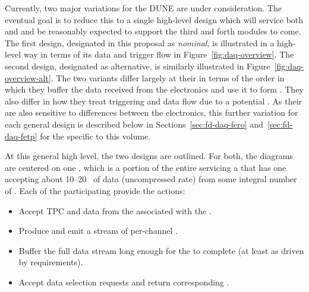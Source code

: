 Currently, two major variations for the DUNE  are under consideration. %
The eventual goal is to reduce this to a single high-level design
which will service both \single and \dual {} and be reasonably
expected to support the third and forth modules to come.
The first design, designated in this proposal as \textit{nominal}, is
illustrated in a high-level way in terms of its data and trigger flow
in Figure~\ref{fig:daq-overview}. 
The second design, designated as alternative, is similarly
illustrated in Figure~\ref{fig:daq-overview-alt}. 
The two variants differ largely at their  in terms of the
order in which they buffer the data received from the  
electronics and use it to form . 
They also differ in how they treat triggering and data flow due to a
potential . 
As their  are also sensitive to differences between the
 electronics, this further variation for each general
design is described below in Sections~\ref{sec:fd-daq-fero}
and~\ref{sec:fd-daq-fetp} for the   specific to this volume.

At this general high level, the two designs are outlined. %
For both, the diagrams are %
centered on one 
, which is a portion of the entire  servicing a
 that has one  accepting about
\numrange{10}{20}~\si{\Gbps} of data (uncompressed rate) from some integral
number of . 
Each of the participating  provide the actions:
\begin{itemize}
\item Accept TPC and  data from the  associated with the .
\item Produce and emit a stream of per-channel .
\item Buffer the full data stream long enough for the  to complete (at least \snbpretime as driven by  requirements).
\item Accept data selection requests and return corresponding .
\end{itemize}


